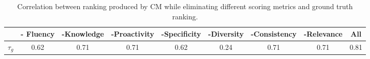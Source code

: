 \begin{table}[ht!]
\centering
\small
\begin{tabular}{lcccccccc}
\toprule
&- Fluency&-Knowledge& -Proactivity& -Specificity& -Diversity& -Consistency & -Relevance &All \\ \midrule
$\tau_{g}$ &0.62 &0.71 &0.71&0.62 &0.24&0.71& 0.71&0.81   \\
\bottomrule
\end{tabular}
\caption{Correlation between ranking produced by CM while eliminating different scoring metrics and ground truth ranking.
}
\label{tab:minus}
\end{table}






